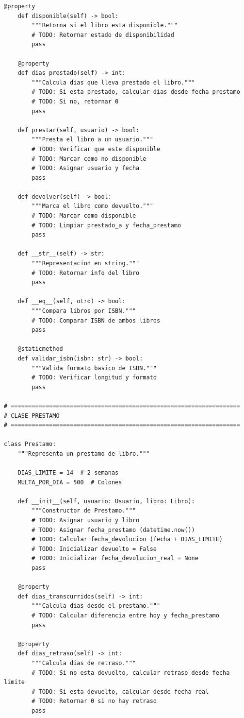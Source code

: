 \documentclass[11pt,letterpaper]{article}
\begin{document}
\begin{lstlisting}[caption={Plantilla de clases principales}]
    @property
    def disponible(self) -> bool:
        """Retorna si el libro esta disponible."""
        # TODO: Retornar estado de disponibilidad
        pass
    
    @property
    def dias_prestado(self) -> int:
        """Calcula dias que lleva prestado el libro."""
        # TODO: Si esta prestado, calcular dias desde fecha_prestamo
        # TODO: Si no, retornar 0
        pass
    
    def prestar(self, usuario) -> bool:
        """Presta el libro a un usuario."""
        # TODO: Verificar que este disponible
        # TODO: Marcar como no disponible
        # TODO: Asignar usuario y fecha
        pass
    
    def devolver(self) -> bool:
        """Marca el libro como devuelto."""
        # TODO: Marcar como disponible
        # TODO: Limpiar prestado_a y fecha_prestamo
        pass
    
    def __str__(self) -> str:
        """Representacion en string."""
        # TODO: Retornar info del libro
        pass
    
    def __eq__(self, otro) -> bool:
        """Compara libros por ISBN."""
        # TODO: Comparar ISBN de ambos libros
        pass
    
    @staticmethod
    def validar_isbn(isbn: str) -> bool:
        """Valida formato basico de ISBN."""
        # TODO: Verificar longitud y formato
        pass

# ==================================================================
# CLASE PRESTAMO
# ==================================================================

class Prestamo:
    """Representa un prestamo de libro."""
    
    DIAS_LIMITE = 14  # 2 semanas
    MULTA_POR_DIA = 500  # Colones
    
    def __init__(self, usuario: Usuario, libro: Libro):
        """Constructor de Prestamo."""
        # TODO: Asignar usuario y libro
        # TODO: Asignar fecha_prestamo (datetime.now())
        # TODO: Calcular fecha_devolucion (fecha + DIAS_LIMITE)
        # TODO: Inicializar devuelto = False
        # TODO: Inicializar fecha_devolucion_real = None
        pass
    
    @property
    def dias_transcurridos(self) -> int:
        """Calcula dias desde el prestamo."""
        # TODO: Calcular diferencia entre hoy y fecha_prestamo
        pass
    
    @property
    def dias_retraso(self) -> int:
        """Calcula dias de retraso."""
        # TODO: Si no esta devuelto, calcular retraso desde fecha limite
        # TODO: Si esta devuelto, calcular desde fecha real
        # TODO: Retornar 0 si no hay retraso
        pass
    

\end{lstlisting}
\end{document}
